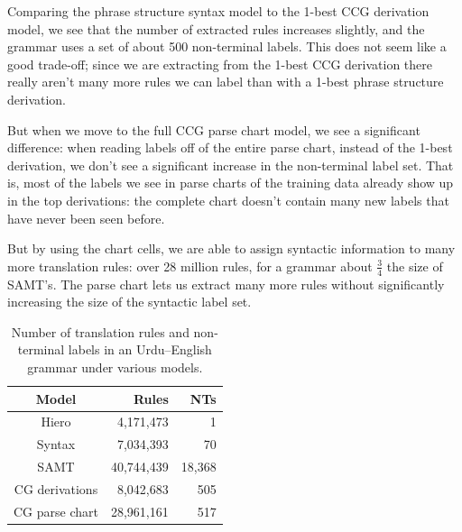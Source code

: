 \documentclass[a4paper]{article}
\begin{document}
Comparing the phrase structure syntax model to the 1-best CCG derivation model, we see that the number of extracted rules increases slightly, and the grammar uses a set of about 500 non-terminal labels. This does not seem like a good trade-off; since we are extracting from the 1-best CCG derivation there really aren't many more rules we can label than with a 1-best phrase structure derivation.

But when we move to the full CCG parse chart model, we see a significant difference: when reading labels off of the entire parse chart, instead of the 1-best derivation, we don't see a significant increase in the non-terminal label set. That is, most of the labels we see in parse charts of the training data already show up in the top derivations: the complete chart doesn't contain many new labels that have never been seen before.

But by using the chart cells, we are able to assign syntactic information to many more translation rules: over 28 million rules, for a grammar about $\frac{3}{4}$ the size of SAMT's. The parse chart lets us extract many more rules without significantly increasing the size of the syntactic label set.

\begin{table}
\centering
\begin{tabular}{|c|r|r|}
\hline
Model & Rules & NTs\\
\hline
Hiero & 4,171,473 & 1\\
Syntax & 7,034,393 & 70\\
SAMT & 40,744,439 & 18,368\\
CG derivations & 8,042,683 & 505\\
CG parse chart & 28,961,161 & 517\\
\hline
\end{tabular}
\caption{Number of translation rules and non-terminal labels in an Urdu--English grammar under various models.\label{table:rule-count}}
\end{table}

\end{document}
